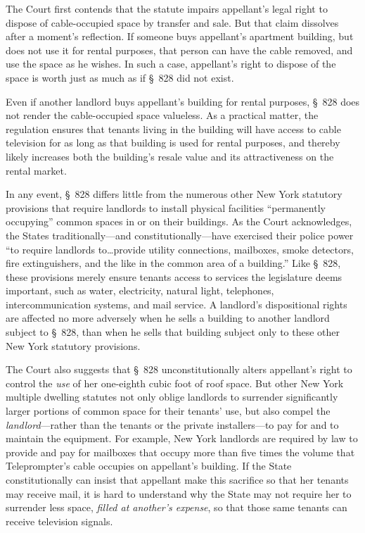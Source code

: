 The Court first contends that the statute impairs appellant's legal right to
dispose of cable-occupied space by transfer and sale. But that claim dissolves
after a moment's reflection. If someone buys appellant's apartment building, but
does not use it for rental purposes, that person can have the cable removed, and
use the space as he wishes. In such a case, appellant's right to dispose of the
space is worth just as much as if \S~828 did not exist.

Even if another landlord buys appellant's building for rental purposes, \S~828
does not render the cable-occupied space valueless. As a practical matter, the
regulation ensures that tenants living in the building will have access to cable
television for as long as that building is used for rental purposes, and thereby
likely increases both the building's resale value and its attractiveness on the
rental market.

In any event, \S~828 differs little from the numerous other New York statutory
provisions that require landlords to install physical facilities ``permanently
occupying'' common spaces in or on their buildings. As the Court acknowledges,
the States traditionally---and constitutionally---have exercised their police
power ``to require landlords to\ldots provide utility connections, mailboxes,
smoke detectors, fire extinguishers, and the like in the common area of a
building.'' Like \S~828, these provisions merely ensure tenants access to
services the legislature deems important, such as water, electricity, natural
light, telephones, intercommunication systems, and mail service. A landlord's
dispositional rights are affected no more adversely when he sells a building to
another landlord subject to \S~828, than when he sells that building subject
only to these other New York statutory provisions.

The Court also suggests that \S~828 unconstitutionally alters appellant's right
to control the \textit{use} of her one-eighth cubic foot of roof space. But
other New York multiple dwelling statutes not only oblige landlords to surrender
significantly larger portions of common space for their tenants' use, but also
compel the \textit{landlord}---rather than the tenants or the private
installers---to pay for and to maintain the equipment. For example, New York
landlords are required by law to provide and pay for mailboxes that occupy more
than five times the volume that Teleprompter's cable occupies on appellant's
building. If the State constitutionally can insist that appellant make this
sacrifice so that her tenants may receive mail, it is hard to understand why the
State may not require her to surrender less space, \textit{filled at another's
expense}, so that those same tenants can receive television signals.

